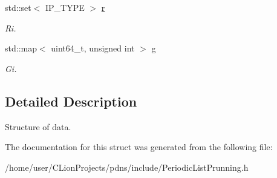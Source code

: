 \begin{DoxyCompactItemize}
\mbox{\label{structCandidate_a5e00fbe86010ba565a3a74cdac745cf7}} 
std\+::set$<$ I\+P\+\_\+\+T\+Y\+PE $>$ \hyperlink{structCandidate_a5e00fbe86010ba565a3a74cdac745cf7}{r}
\begin{DoxyCompactList}\small\item\em Ri. \end{DoxyCompactList}\item 
\mbox{\label{structCandidate_a99cbcb4edb040eb425025f1a3692ee13}} 
std\+::map$<$ uint64\+\_\+t, unsigned int $>$ \hyperlink{structCandidate_a99cbcb4edb040eb425025f1a3692ee13}{g}
\begin{DoxyCompactList}\small\item\em Gi. \end{DoxyCompactList}\end{DoxyCompactItemize}


\subsection{Detailed Description}
Structure of data. 

The documentation for this struct was generated from the following file\+:\begin{DoxyCompactItemize}
\item 
/home/user/\+C\+Lion\+Projects/pdns/include/Periodic\+List\+Prunning.\+h\end{DoxyCompactItemize}
